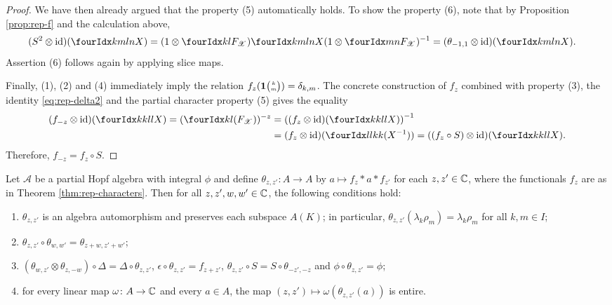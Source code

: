 \begin{proof}
We have then already argued that the property (5) automatically holds. To show the property (6), note that by Proposition \ref{prop:rep-f} and the calculation above,
    \begin{align*}
      (S^{2} \otimes \id)(\Gr{X}{k}{l}{m}{n}) &= (1
      \otimes\Gru{F_{\mathscr{X}}}{k}{l})
      \Gr{X}{k}{l}{m}{n}(1 \otimes \Gru{F_{\mathscr{X}}}{m}{n})^{-1} 
      =(\theta_{-1,1}  \otimes \id)(\Gr{X}{k}{l}{m}{n}).
    \end{align*}
     Assertion (6) follows again by applying slice maps.
    
     Finally, (1), (2) and (4)
     immediately imply the relation
     $f_{z}(\mathbf{1}{\tiny {\begin{pmatrix} k\\m\end{pmatrix}}})=\delta_{k,m}$. The concrete construction of $f_z$ combined with property (3), the identity \eqref{eq:rep-delta2} and the partial character property (5) gives the equality
     \begin{align}
       (f_{-z} \otimes \id) (\Gr{X}{k}{l}{k}{l})=
       (\Gru{(F_{\mathscr{X}})}{k}{l})^{-z} &=\left( (f_{z} \otimes
       \id)(\Gr{X}{k}{l}{k}{l})\right)^{-1} \\ &= (f_{z} \otimes
       \id)(\Gr{(X^{-1})}{l}{k}{l}{k}) = ((f_{z} \circ S) \otimes
       \id)(\Gr{X}{k}{l}{k}{l}).
     \end{align}
Therefore, $f_{-z} = f_{z} \circ S$.
\end{proof}
\begin{Cor} \label{cor:rep-characters} Let $\mathscr{A}$ be a partial
  Hopf algebra with integral $\phi$ and define $\theta_{z,z'} \colon A
  \to A$ by $a \mapsto f_{z} \ast a \ast f_{z'}$ for each $z,z' \in
  \mathbb{C}$, where the functionals $f_{z}$ are as in Theorem
  \ref{thm:rep-characters}. Then for all $z,z',w,w'\in \mathbb{C}$, the
  following conditions hold:
  \begin{enumerate}
  \item $\theta_{z,z'}$ is an algebra automorphism and preserves
    each subspace $A(K)$; in particular,
    $\theta_{z,z'}(\lambda_{k}\rho_{m}) = \lambda_{k}\rho_{m}$ for all
    $k,m\in I$;
  \item $\theta_{z,z'}\circ \theta_{w,w'} = \theta_{z+w,z'+w'}$;
  \item $ (\theta_{w,z'} \otimes \theta_{z,-w}) \circ \Delta = \Delta
    \circ \theta_{z,z'}$, $\epsilon \circ \theta_{z,z'} = f_{z+z'}$,
    $\theta_{z,z'} \circ S = S \circ \theta_{-z',-z}$ and
    $\phi \circ \theta_{z,z'} = \phi$;
  \item for every linear map $\omega \colon A \to \mathbb{C}$ and every $a\in
    A$, the map $(z,z') \mapsto \omega(\theta_{z,z'}(a))$ is entire.
  \end{enumerate}
\end{Cor}
